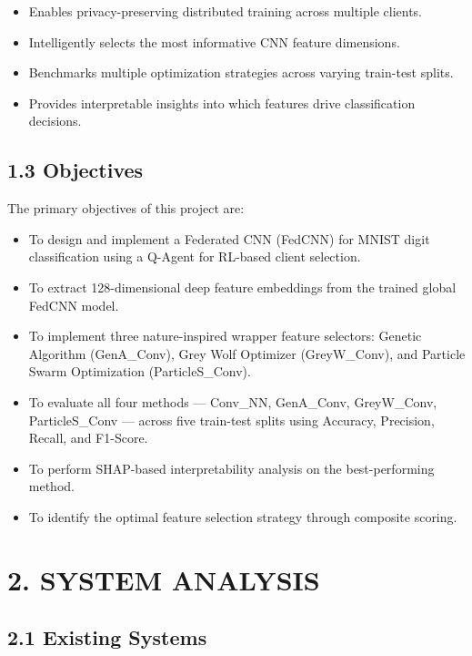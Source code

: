 \documentclass[
]{article}
\begin{document}
\begin{itemize}
\item
  Enables privacy-preserving distributed training across multiple
  clients.
\item
  Intelligently selects the most informative CNN feature dimensions.
\item
  Benchmarks multiple optimization strategies across varying train-test
  splits.
\item
  Provides interpretable insights into which features drive
  classification decisions.
\end{itemize}

\hypertarget{objectives}{%
\subsection{1.3 Objectives}\label{objectives}}

The primary objectives of this project are:

\begin{itemize}
\item
  To design and implement a Federated CNN (FedCNN) for MNIST digit
  classification using a Q-Agent for RL-based client selection.
\item
  To extract 128-dimensional deep feature embeddings from the trained
  global FedCNN model.
\item
  To implement three nature-inspired wrapper feature selectors: Genetic
  Algorithm (GenA\_Conv), Grey Wolf Optimizer (GreyW\_Conv), and
  Particle Swarm Optimization (ParticleS\_Conv).
\item
  To evaluate all four methods --- Conv\_NN, GenA\_Conv, GreyW\_Conv,
  ParticleS\_Conv --- across five train-test splits using Accuracy,
  Precision, Recall, and F1-Score.
\item
  To perform SHAP-based interpretability analysis on the best-performing
  method.
\item
  To identify the optimal feature selection strategy through composite
  scoring.
\end{itemize}

\hypertarget{system-analysis}{%
\section{2. SYSTEM ANALYSIS}\label{system-analysis}}

\hypertarget{existing-systems}{%
\subsection{2.1 Existing Systems}\label{existing-systems}}
\end{document}
